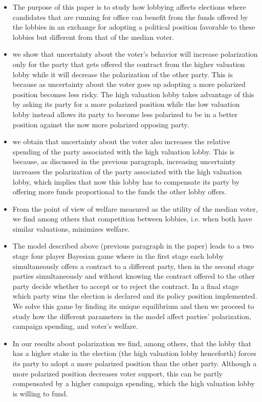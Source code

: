 \documentclass[a4paper,12pt]{article}
\begin{document}
\begin{enumerate}
\begin{itemize}
\item The purpose of this paper is to study how lobbying affects elections where candidates that are running for office can benefit from the funds offered by the lobbies in an exchange for adopting a political position favorable to these lobbies but different from that of the median voter.
\item we show that uncertainty about the voter’s behavior will increase polarization only for the party that gets offered the contract from the higher valuation lobby while it will decrease the polarization of the other party. This is because as uncertainty about the voter goes up adopting a more polarized position becomes less risky. The high valuation lobby takes advantage of this by asking its party for a more polarized position while the low valuation lobby instead allows its party to become less polarized to be in a better position against the now more polarized opposing party.
\item we obtain that uncertainty about the voter also increases the relative spending of the party associated with the high valuation lobby. This is because, as discussed in the previous paragraph, increasing uncertainty increases the polarization of the party associated with the high valuation lobby, which implies that now this lobby has to compensate its party by offering more funds proportional to the funds the other lobby offers.
\item From the point of view of welfare measured as the utility of the median voter, we find among others that competition between lobbies, i.e. when both have similar valuations, minimizes welfare. 
\item The model described above (previous paragraph in the paper) leads to a two stage four player Bayesian game where in the first stage each lobby simultaneously offers a contract to a different party, then in the second stage parties simultaneously and without knowing the contract offered to the other party decide whether to accept or to reject the contract. In a final stage which party wins the election is declared and its policy position implemented. We solve this game by finding its unique equilibrium and then we proceed to study how the different parameters in the model affect parties’ polarization, campaign spending, and voter’s welfare. 
\item In our results about polarization we find, among others, that the lobby that has a higher stake in the election (the high valuation lobby henceforth) forces its party to adopt a more polarized position than the other party. Although a more polarized position decreases voter support, this can be partly compensated by a higher campaign spending, which the high valuation lobby is willing to fund. 

\end{itemize}
\end{enumerate}
\end{document}
